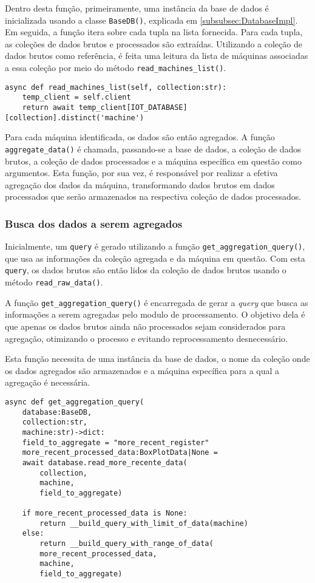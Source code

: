 Dentro desta função, primeiramente, uma instância da base de dados é inicializada usando a classe \texttt{BaseDB()}, explicada em \ref{subsubsec:DatabaseImpl}. Em seguida, a função itera sobre cada tupla na lista fornecida. Para cada tupla, as coleções de dados brutos e processados são extraídas. Utilizando a coleção de dados brutos como referência, é feita uma leitura da lista de máquinas associadas a essa coleção por meio do método \texttt{read\_machines\_list()}.

\begin{verbatim}
async def read_machines_list(self, collection:str):
    temp_client = self.client
    return await temp_client[IOT_DATABASE][collection].distinct('machine')
\end{verbatim}


Para cada máquina identificada, os dados são então agregados. A função \texttt{aggregate\_data()} é chamada, passando-se a base de dados, a coleção de dados brutos, a coleção de dados processados e a máquina específica em questão como argumentos. Esta função, por sua vez, é responsável por realizar a efetiva agregação dos dados da máquina, transformando dados brutos em dados processados que serão armazenados na respectiva coleção de dados processados.

\subsubsection{Busca dos dados a serem agregados}
Inicialmente, um \texttt{query} é gerado utilizando a função \texttt{get\_aggregation\_query()}, que usa as informações da coleção agregada e da máquina em questão. Com esta \texttt{query}, os dados brutos são então lidos da coleção de dados brutos usando o método \texttt{read\_raw\_data()}.

A função \texttt{get\_aggregation\_query()} é encarregada de gerar a \textit{query} que busca as informações a serem agregadas pelo modulo de processamento. O objetivo dela é que apenas os dados brutos ainda não processados sejam considerados para agregação, otimizando o processo e evitando reprocessamento desnecessário.

Esta função necessita de uma instância da base de dados, o nome da coleção onde os dados agregados são armazenados e a máquina específica para a qual a agregação é necessária.

\begin{verbatim}
async def get_aggregation_query(
    database:BaseDB,
    collection:str,
    machine:str)->dict:
    field_to_aggregate = "more_recent_register"
    more_recent_processed_data:BoxPlotData|None = 
    await database.read_more_recente_data(
        collection,
        machine,
        field_to_aggregate)
    
    if more_recent_processed_data is None:
        return __build_query_with_limit_of_data(machine) 
    else:
        return __build_query_with_range_of_data(
        more_recent_processed_data,
        machine,
        field_to_aggregate)
\end{verbatim}


